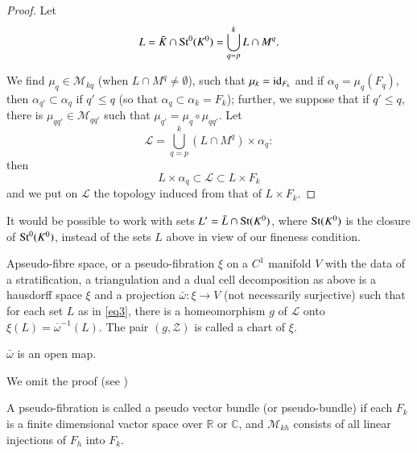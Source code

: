 \begin{proof}
Let
$$
L=\bar{K}\cap \operatorname{St}^{0}(K^{0})=\bigcup^{k}_{q=p}L\cap M^{q}.
$$

We find $\mu_{q}\in\mathscr{M}_{kq}$ (when $L\cap M^{q}\neq
\emptyset$), such that $\mu_{k}=\operatorname{id}_{F_{k}}$ and if
$\alpha_{q}=\mu_{q}(F_{q})$, then $\alpha_{q'}\subset \alpha_{q}$ if
$q'\leq q$ (so that $\alpha_{q}\subset \alpha_{k}=F_{k}$); further, we
suppose that if $q'\leq q$, there is $\mu_{qq'}\in\mathscr{M}_{qq'}$
such that $\mu_{q'}=\mu_{q}\circ \mu_{qq'}$. Let
\begin{equation*}
\mathscr{L}=\bigcup^{k}_{q=p}(L\cap
M^{q})\times\alpha_{q}:\tag{5}\label{eq5} 
\end{equation*}
then
$$
L\times \alpha_{q}\subset \mathscr{L}\subset L\times F_{k}
$$
and we put on $\mathscr{L}$ the topology induced from that of $L\times
F_{k}$. 
\end{proof}

\begin{remark*} %
It would be possible to work with sets $L'=\bar{L}\cap \operatorname{St}(K^{0})$,
where $\operatorname{St}(K^{0})$ is the closure of $\operatorname{St}^{0}(K^{0})$, instead of the
sets $L$ above in view of our fineness condition.
\end{remark*}

\setcounter{definition}{0}
\begin{definition}\label{chap4-defi1} %
A\pageoriginale pseudo-fibre space, or a pseudo-fibration $\xi$ on a
$C^1$ manifold $V$ with the data of a stratification, a triangulation
and a dual cell decomposition as above is a hausdorff space $\xi$ and
a projection $\bar{\omega}:\xi\to V$  (not necessarily surjective)
such that for each set $L$ as in \eqref{eq3}, there is a homeomorphism
$g$ of $\mathscr{L}$ onto $\xi(L)=\overline{\omega}^{-1}(L)$. The pair
$(g,\mathscr{Z})$ is called a chart of $\xi$.
\end{definition}

\begin{lemma}\label{chap4-lem2}
$\bar{\omega}$ is an open map.
\end{lemma}

We omit the proof (see \cite{key3})

\begin{definition}\label{chap4-defi2} %
  A pseudo-fibration is called a pseudo vector bundle (or
    pseudo-bundle) if each $F_k$ is a finite dimensional vactor
    space over  $\mathbb{R}$ or $ \mathbb{C}$, and $\mathscr{M}_{kh}$
    consists of all linear injections  of $F_h$ into $F_k$.  
\end{definition}

